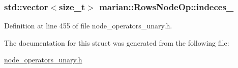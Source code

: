 \subsubsection[{\texorpdfstring{indeces\+\_\+}{indeces_}}]{\setlength{\rightskip}{0pt plus 5cm}std\+::vector$<$size\+\_\+t$>$ marian\+::\+Rows\+Node\+Op\+::indeces\+\_\+}\hypertarget{structmarian_1_1RowsNodeOp_af1b339d23160f23deb443398e2be3f84}{}\label{structmarian_1_1RowsNodeOp_af1b339d23160f23deb443398e2be3f84}


Definition at line 455 of file node\+\_\+operators\+\_\+unary.\+h.



The documentation for this struct was generated from the following file\+:\begin{DoxyCompactItemize}
\item 
\hyperlink{node__operators__unary_8h}{node\+\_\+operators\+\_\+unary.\+h}\end{DoxyCompactItemize}
